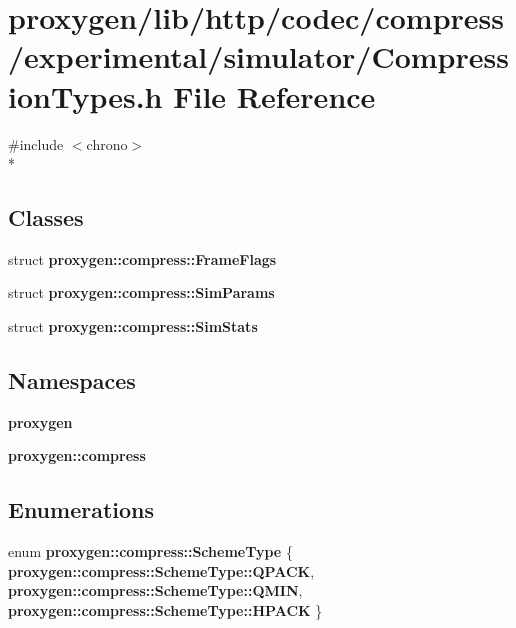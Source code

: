 \section{proxygen/lib/http/codec/compress/experimental/simulator/\+Compression\+Types.h File Reference}
\label{CompressionTypes_8h}
{\ttfamily \#include $<$chrono$>$}\\*
\subsection*{Classes}
\begin{DoxyCompactItemize}
\item 
struct {\bf proxygen\+::compress\+::\+Frame\+Flags}
\item 
struct {\bf proxygen\+::compress\+::\+Sim\+Params}
\item 
struct {\bf proxygen\+::compress\+::\+Sim\+Stats}
\end{DoxyCompactItemize}
\subsection*{Namespaces}
\begin{DoxyCompactItemize}
\item 
 {\bf proxygen}
\item 
 {\bf proxygen\+::compress}
\end{DoxyCompactItemize}
\subsection*{Enumerations}
\begin{DoxyCompactItemize}
\item 
enum {\bf proxygen\+::compress\+::\+Scheme\+Type} \{ {\bf proxygen\+::compress\+::\+Scheme\+Type\+::\+Q\+P\+A\+CK}, 
{\bf proxygen\+::compress\+::\+Scheme\+Type\+::\+Q\+M\+IN}, 
{\bf proxygen\+::compress\+::\+Scheme\+Type\+::\+H\+P\+A\+CK}
 \}
\end{DoxyCompactItemize}

